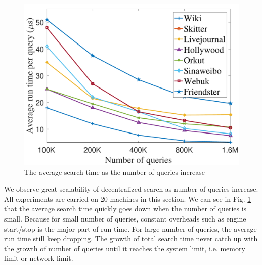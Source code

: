 \begin{figure}[t]
    \centering
    \includegraphics[width=\linewidth]{./figures/scale_query.pdf}
    \caption{The average search time as the number of queries increase}
    \label{fig:scale_query}
\end{figure}

We observe great scalability of decentralized search as number of queries increase. All experiments are carried on 20 machines in this section. We can see in Fig. \ref{fig:scale_query} that the average search time quickly goes down when the number of queries is small. Because for small number of queries, constant overheads such as engine start/stop is the major part of run time. For large number of queries, the average run time still keep dropping. The growth of total search time never catch up with the growth of number of queries until it reaches the system limit, i.e. memory limit or network limit.

%

